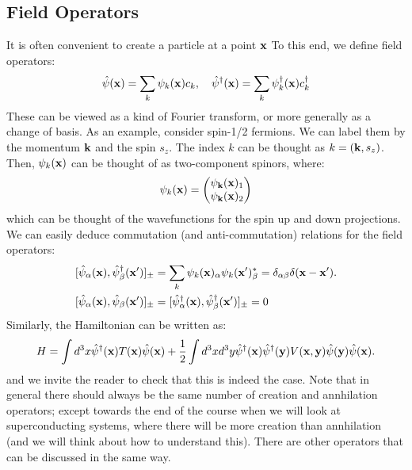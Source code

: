 \subsection{Field Operators}
It is often convenient to create a particle at a point $\mathbf{x}$ To this end, we define field operators:
\begin{equation}
    \hat{\psi}(\mathbf{x}) = \sum_k \psi_k(\mathbf{x})c_k, \quad \hat{\psi}^\dagger(\mathbf{x}) = \sum_k \psi_k^\dagger(\mathbf{x})c_k^\dagger
\end{equation}
These can be viewed as a kind of Fourier transform, or more generally as a change of basis. As an example, consider spin-1/2 fermions. We can label them by the momentum $\mathbf{k}$ and the spin $s_z$. The index $k$ can be thought as $k = (\mathbf{k}, s_z)$. Then, $\psi_k(\mathbf{x})$ can be thought of as two-component spinors, where:
\begin{equation}
    \psi_k(\mathbf{x}) = \begin{pmatrix}\psi_{\mathbf{k}}(\mathbf{x})_1 \\ \psi_{\mathbf{k}}(\mathbf{x})_2\end{pmatrix}
\end{equation}
which can be thought of the wavefunctions for the spin up and down projections. We can easily deduce commutation (and anti-commutation) relations for the field operators:
\begin{equation}
    \begin{split}
        &[\hat{\psi}_\alpha(\mathbf{x}), \hat{\psi}_\beta^\dagger(\mathbf{x}')]_\pm = \sum_k \psi_k(\mathbf{x})_\alpha \psi_k(\mathbf{x}')_\beta^* = \delta_{\alpha\beta}\delta(\mathbf{x} - \mathbf{x}').
        \\ &[\hat{\psi}_\alpha(\mathbf{x}), \hat{\psi}_\beta(\mathbf{x}')]_\pm = [\hat{\psi}^\dagger_\alpha(\mathbf{x}), \hat{\psi}^\dagger_\beta(\mathbf{x}')]_\pm = 0
    \end{split}
\end{equation}
Similarly, the Hamiltonian can be written as:
\begin{equation}
    H = \int d^3x \hat{\psi}^\dagger(\mathbf{x})T(\mathbf{x})\hat{\psi}(\mathbf{x}) + \frac{1}{2}\int d^3xd^3y \hat{\psi}^\dagger(\mathbf{x})\hat{\psi}^\dagger(\mathbf{y}) V(\mathbf{x}, \mathbf{y})\hat{\psi}(\mathbf{y})\hat{\psi}(\mathbf{x}).
\end{equation}
and we invite the reader to check that this is indeed the case. Note that in general there should always be the same number of creation and annhilation operators; except towards the end of the course when we will look at superconducting systems, where there will be more creation than annhilation (and we will think about how to understand this). There are other operators that can be discussed in the same way. 
